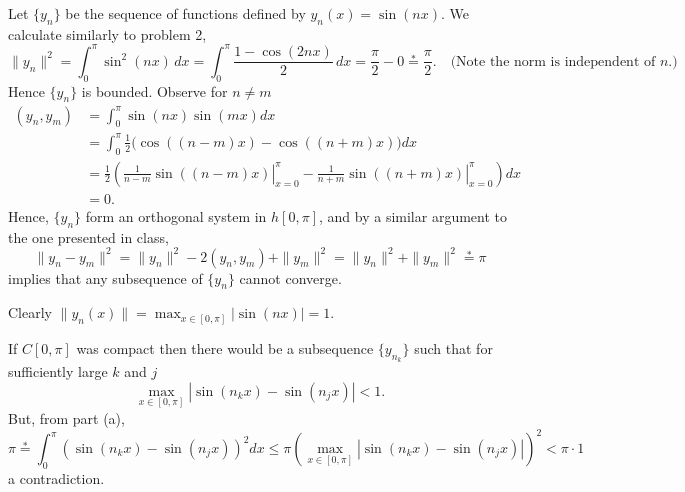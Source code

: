 \documentclass{homework}
\begin{document}
\begin{solution}
Let $\{y_n\}$ be the sequence of functions defined by $y_n(x) = \sin(nx)$.  We calculate similarly to problem 2,
$$
\|y_n\|^2 = \int_0^{\pi} \sin^2 (nx)\, dx   
= \int_0^{\pi} \frac{1 - \cos(2nx)}{2}\, dx  
= \frac \pi2 - 0 \stackrel*= \frac \pi2. \quad\text{(Note the norm is independent of $n$.)}
$$
Hence $\{y_n\}$ is bounded. Observe for $n\not=m$
\begin{align*}
  (y_n,y_m) 
  &= \int_0^\pi \sin(nx)\sin(mx) dx \\
  &= \int_0^\pi \frac 12\Big(\cos((n-m)x) - \cos((n+m)x) \Big)dx \\
  &= \frac 12\left(\left.\frac1{n-m}\sin((n-m)x)\right|_{x=0}^\pi - \left.\frac 1{n+m}\sin((n+m)x)\right|_{x=0}^\pi \right)dx \\
  &= 0.
\end{align*}
Hence, $\{y_n\}$ form an orthogonal system in $h[0,\pi]$, and by a similar argument to the one presented in class,
$$
  \|y_n - y_m\|^2= \|y_n\|^2 -2(y_n,y_m)+ \|y_m\|^2 = \|y_n\|^2 + \|y_m\|^2 \stackrel*= \pi
$$
implies that any subsequence of $\{y_n\}$ cannot converge.
\end{solution}


\begin{solution}
Clearly $\|y_n(x)\| = \max_{x\in[0,\pi]}|\sin(nx)| = 1$.

If $C[0,\pi]$ was compact then there would be a subsequence $\{y_{n_k}\}$ such that for sufficiently large $k$ and $j$
$$
  \max_{x\in[0,\pi]}|\sin(n_kx) - \sin(n_jx)| < 1.
$$
But, from part (a),
$$
  \pi \stackrel*= \int_0^\pi (\sin(n_kx) - \sin(n_jx))^2 dx \le \pi \left(\max_{x\in[0,\pi]}|\sin(n_kx) - \sin(n_jx)|\right)^2 < \pi\cdot 1
$$
a contradiction.
\end{solution}
\end{document}
